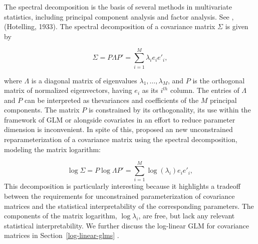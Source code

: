 The spectral decomposition is the basis of several methods in multivariate statistics, including principal component analysis and factor analysis. See \citet{Anderson84a},  (Hotelling, 1933). The spectral decomposition of a covariance matrix $\Sigma$ is given by

\begin{equation} \label{eq:spectral-decomposition}
\Sigma = P \Lambda P' = \sum_{i = 1}^M \lambda_i e_i e'_i,
\end{equation}

where $\Lambda$ is a diagonal matrix of eigenvalues $\lambda_1,\dots, \lambda_M$, and $P$ is the orthogonal matrix of normalized eigenvectors, having  $e_i$ as its $i^{th}$ column. The entries of $\Lambda$ and $P$ can be interpreted as thevariances and coefficients of the $M$ principal components. The matrix $P$ is constrained by its orthogonality, its use within the framework of GLM or alongside covariates in an effort to reduce parameter dimension is inconvenient. In spite of this,  \citet{chiu1996matrix} proposed an new unconstrained reparameterization of a covariance matrix using the spectral decomposition, modeling the matrix logarithm:

\begin{equation} \label{eq:spectral-decomposition}
\log \Sigma = P \log\Lambda P' = \sum_{i = 1}^M \log\left(\lambda_i \right)e_i e'_i,
\end{equation}
\noindent
This decomposition is particularly interesting because it highlights a tradeoff between the requirements for unconstrained parameterization of covariance matrices and the statistical interpretability of the corresponding parameters. The components of the matrix logarithm, $\log \lambda_i$, are free, but lack any relevant statistical interpretability. We further discuss the log-linear GLM for covariance matrices in Section~\ref{log-linear-glms} .

